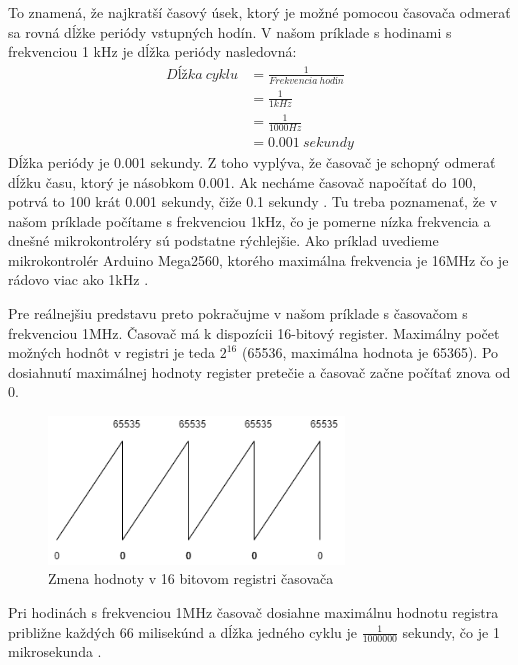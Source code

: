 To znamená, že najkratší časový úsek, ktorý je možné pomocou časovača odmerať sa
rovná dĺžke periódy vstupných hodín. V našom príklade s hodinami s frekvenciou 1 \acrshort{kHz} je dĺžka periódy nasledovná:
\begin{equation}
    \begin{aligned}
        Dĺžka\:cyklu & = \frac{1}{Frekvencia\:hodín} \\
                     & = \frac{1}{1kHz}              \\
                     & = \frac{1}{ 1000 Hz}          \\
                     & =  0.001\:sekundy
    \end{aligned}
\end{equation}
Dĺžka periódy je 0.001 sekundy. Z toho vyplýva, že časovač je schopný odmerať dĺžku času, ktorý je násobkom 0.001. Ak necháme časovač napočítať do 100, potrvá to 100 krát 0.001 sekundy, čiže 0.1 sekundy \cite{cameraNewbieGuideAVR2015}.
Tu treba poznamenať, že v našom príklade počítame s frekvenciou 1kHz, čo je pomerne nízka frekvencia a dnešné mikrokontroléry sú podstatne rýchlejšie.
Ako príklad uvedieme mikrokontrolér Arduino Mega2560, ktorého maximálna frekvencia je 16MHz čo je rádovo viac ako 1kHz \cite{ArduinoMega2560}.
\par Pre reálnejšiu predstavu preto pokračujme v našom príklade s časovačom s frekvenciou 1MHz. Časovač má k dispozícii 16-bitový register. Maximálny počet
možných hodnôt v registri je teda $2^{16}$ (65536, maximálna hodnota je 65365).
Po dosiahnutí maximálnej hodnoty register pretečie a časovač začne počítať znova od 0.
\begin{figure}[!h]
    \centering
    \includegraphics[width=0.70\textwidth]{img/timer.png}
    \caption{Zmena hodnoty v 16 bitovom registri časovača}
    \label{figure:timer1}
\end{figure}

Pri hodinách s frekvenciou 1MHz časovač dosiahne maximálnu hodnotu registra približne každých 66 milisekúnd a dĺžka jedného cyklu je $\frac{1}{1000000}$ sekundy, čo je 1 mikrosekunda \cite{cameraNewbieGuideAVR2015}.

